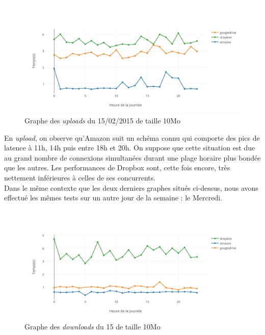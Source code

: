 \documentclass[10pt]{article}
\begin{document}
\begin{figure}[h] \centering
\includegraphics[scale=0.7]{graphe_du_15022015_pour_les_uploads_de_10mo.png}
\caption{Graphe des \textit{uploads} du 15/02/2015 de taille 10Mo} \end{figure}

En \textit{upload}, on observe qu'Amazon suit un schéma connu qui comporte
des pics de latence à 11h, 14h puis entre 18h et 20h. On suppose que cette
situation est due au grand nombre de connexions simultanées durant une plage
horaire plus bondée que les autres. Les performances de Dropbox sont, cette
fois encore, très nettement inférieures à celles de ses concurrents.\\

Dans le même contexte que les deux derniers graphes situés ci-dessus, nous avons
effectué les mêmes tests sur un autre jour de la semaine : le Mercredi.\\

\begin{figure}[h] \centering
\includegraphics[scale=0.65]{graphe_des_downloads_du_18022015_de_taille_10mo.png}
\caption{Graphe des \textit{downloads} du 15 de taille 10Mo} \end{figure}
\end{document}
